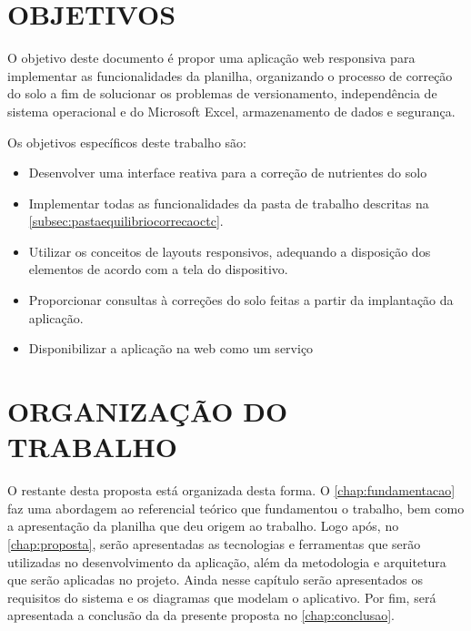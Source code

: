 \section{OBJETIVOS}
\label{sec:objetivos}

O objetivo deste documento é propor uma aplicação web responsiva para implementar as funcionalidades da planilha, organizando o processo de correção do solo a fim de solucionar os problemas de versionamento, independência de sistema operacional e do Microsoft Excel, armazenamento de dados e segurança.

Os objetivos específicos deste trabalho são:

\begin{itemize}
    \item Desenvolver uma interface reativa para a correção de nutrientes do solo
    
    \item Implementar todas as funcionalidades da pasta de trabalho descritas na  \autoref{subsec:pastaequilibriocorrecaoctc}.
    
    \item Utilizar os conceitos de layouts responsivos, adequando a disposição dos elementos de acordo com a tela do dispositivo.
    
    \item Proporcionar consultas à correções do solo feitas a partir da implantação da aplicação.
    
    \item Disponibilizar a aplicação na web como um serviço
\end{itemize}

\section{ORGANIZAÇÃO DO TRABALHO}
\label{sec:organizacaoTrabalho}

O restante desta proposta está organizada desta forma. O \autoref{chap:fundamentacao} faz uma abordagem ao referencial teórico que fundamentou o trabalho, bem como a apresentação da planilha que deu origem ao trabalho. Logo após, no \autoref{chap:proposta}, serão apresentadas as tecnologias e ferramentas que serão utilizadas no desenvolvimento da aplicação, além da metodologia e arquitetura que serão aplicadas no projeto. Ainda nesse capítulo serão apresentados os requisitos do sistema e os diagramas que modelam o aplicativo. Por fim, será apresentada a conclusão da da presente proposta no \autoref{chap:conclusao}.
